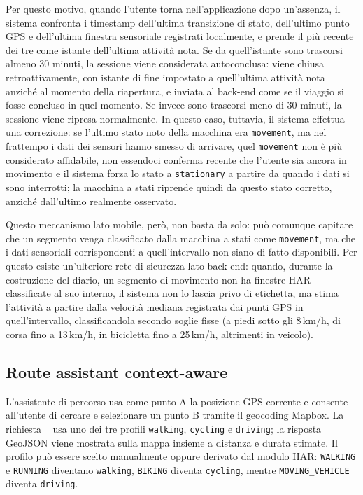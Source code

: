 \documentclass[conference]{IEEEtran}
\begin{document}
Per questo motivo, quando l'utente torna nell'applicazione dopo
un'assenza, il sistema confronta i timestamp dell'ultima transizione
di stato, dell'ultimo punto GPS e dell'ultima finestra sensoriale
registrati localmente, e prende il più recente dei tre come istante
dell'ultima attività nota. Se da quell'istante sono trascorsi almeno
30 minuti, la sessione viene considerata autoconclusa: viene chiusa
retroattivamente, con istante di fine impostato a quell'ultima
attività nota anziché al momento della riapertura, e inviata al
back-end come se il viaggio si fosse concluso in quel momento. Se
invece sono trascorsi meno di 30 minuti, la sessione viene ripresa
normalmente. In questo caso, tuttavia, il sistema effettua una
correzione: se l'ultimo stato noto della macchina era
\texttt{movement}, ma nel frattempo i dati dei sensori hanno smesso di
arrivare, quel \texttt{movement} non è più considerato affidabile,
non essendoci conferma recente che l'utente sia ancora in movimento
e il sistema forza lo stato a \texttt{stationary} a partire da quando
i dati si sono interrotti; la macchina a stati riprende quindi da
questo stato corretto, anziché dall'ultimo realmente osservato.

Questo meccanismo lato mobile, però, non basta da solo: può comunque
capitare che un segmento venga classificato dalla macchina a stati
come \texttt{movement}, ma che i dati sensoriali corrispondenti a
quell'intervallo non siano di fatto disponibili.
Per questo esiste un'ulteriore rete di
sicurezza lato back-end: quando, durante la costruzione del diario, un
segmento di movimento non ha finestre HAR classificate al suo interno,
il sistema non lo lascia privo di etichetta, ma stima l'attività a
partire dalla velocità mediana registrata dai punti GPS in
quell'intervallo, classificandola secondo soglie fisse (a piedi sotto
gli 8\,km/h, di corsa fino a 13\,km/h, in bicicletta fino a 25\,km/h,
altrimenti in veicolo).

\subsection{Route assistant context-aware}

L'assistente di percorso usa come punto A la posizione GPS corrente e
consente all'utente di cercare e selezionare un punto B tramite il
geocoding Mapbox. La richiesta ~\cite{mapbox-directions} usa uno dei tre profili
\texttt{walking}, \texttt{cycling} e \texttt{driving}; la risposta
GeoJSON viene mostrata sulla mappa insieme a distanza e durata stimate.
Il profilo può essere scelto manualmente oppure derivato dal modulo HAR:
\texttt{WALKING} e \texttt{RUNNING} diventano \texttt{walking},
\texttt{BIKING} diventa \texttt{cycling}, mentre
\texttt{MOVING\_VEHICLE} diventa \texttt{driving}.
\end{document}

